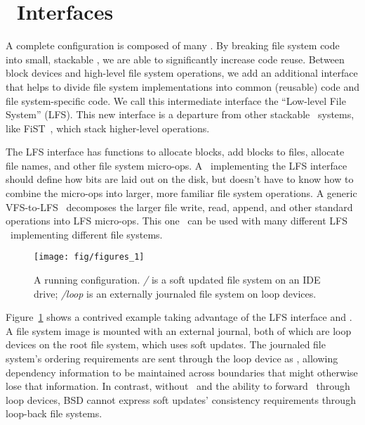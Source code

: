 \section {\Module\ Interfaces}
\label{sec:interfaces}

A complete \Kudos configuration is composed of many \modules. By breaking file
system code into small, stackable \modules, we are able to significantly
increase code reuse. Between block devices and high-level file system
operations, we add an additional interface that helps to divide file system
implementations into common (reusable) code and file system-specific code. We
call this intermediate interface the ``Low-level File System'' (LFS). This new
interface is a departure from other stackable \module\ systems, like
FiST~\cite{zadok00fist}, which stack higher-level operations.

The LFS interface has functions to allocate blocks, add blocks to files,
allocate file names, and other file system micro-ops. A \module\ implementing
the LFS interface should define how bits are laid out on the disk, but doesn't
have to know how to combine the micro-ops into larger, more familiar file system
operations. A generic VFS-to-LFS \module\ decomposes the larger file write,
read, append, and other standard operations into LFS micro-ops. This one
\module\ can be used with many different LFS \modules\ implementing different
file systems.

\begin{figure}[tb]
  \centering
  \texttt{[image: fig/figures\_1]}
  \caption{A running \Kudos configuration. {\it/} is a soft updated
    file system on an IDE drive; {\it/loop} is an externally journaled
    file system on loop devices.}
  \label{fig:kfs-graph}
\end{figure}

Figure~\ref{fig:kfs-graph} shows a contrived example taking advantage of the LFS
interface and \chdescs. A file system image is mounted with an external journal,
both of which are loop devices on the root file system, which uses soft updates.
The journaled file system's ordering requirements are sent through the loop
device as \chdescs, allowing dependency information to be maintained across
boundaries that might otherwise lose that information. In contrast, without
\chdescs\ and the ability to forward \chdescs\ through loop devices, BSD cannot
express soft updates' consistency requirements through loop-back file systems.

